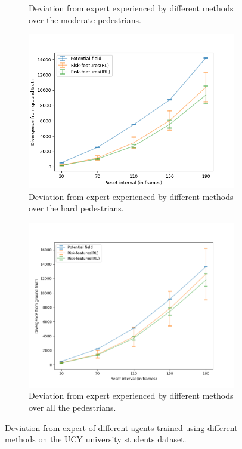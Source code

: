 \begin{figure}[htbp]
\begin{subfigure}{0.5\textwidth}
		\caption{Deviation from expert experienced by different methods over the moderate pedestrians.}
		\label{fig:inter_method-drift_analysis_med}
	\end{subfigure}
	\begin{subfigure}{0.5\textwidth}
		\centering
		\includegraphics[width=\linewidth]{plots/plot_without_outliers/ucy_inter_method_no_outlier/drift_analysis_hard_no_outliers.png}
		\caption{Deviation from expert experienced by different methods over the hard pedestrians.}
		\label{fig:inter_method-drift_analysis_hard}
	\end{subfigure}
	\begin{subfigure}{0.5\textwidth}
		\centering
		\includegraphics[width=\linewidth]{plots/plot_without_outliers/ucy_inter_method_no_outlier/drift_analysis_all_no_outliers.png}
		\caption{Deviation from expert experienced by different methods over all the pedestrians.}
		\label{fig:inter_method-drift_analysis_all}
	\end{subfigure}
	\caption{Deviation from expert of different agents trained using different methods on the UCY university students dataset.}
\end{figure}

